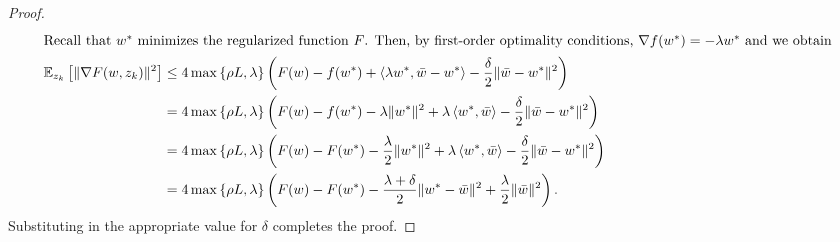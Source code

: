 \begin{proof}
\begin{align*}
       \intertext{Recall that \( w^*\) minimizes the regularized function \( F \). Then, by first-order optimality conditions, \( \nabla f(w^*) = - \lambda w^*\) and we obtain} 
       \mathbb{E}_{z_{k}}\left[\|\nabla F(w, z_{k})\|^2\right] &\leq 4 \max\left\{\rho L, \lambda\right\} \left(F(w) - f(w^*) + \left\langle\lambda w^*, \bar{w} - w^*\right\rangle - \frac{\delta}{2}\|\bar{w} - w^*\|^2 \right)\\
                                                     &= 4 \max\left\{\rho L, \lambda\right\} \left(F(w) - f(w^*) - \lambda \|w^*\|^2  + \lambda \left\langle w^*, \bar{w}\right\rangle - \frac{\delta}{2}\|\bar{w} - w^*\|^2\right)\\
                                                     &=  4 \max\left\{\rho L, \lambda\right\} \left(F(w) - F(w^*) - \frac{\lambda}{2} \|w^*\|^2 + \lambda \left\langle w^*, \bar{w}\right\rangle - \frac{\delta}{2}\|\bar{w} - w^*\|^2\right)\\
                                                     &= 4 \max\left\{\rho L, \lambda\right\} \left(F(w) - F(w^*) - \frac{\lambda + \delta}{2} \|w^* - \bar{w}\|^2 + \frac{\lambda}{2} \|\bar{w}\|^2\right).
   \end{align*} 
   Substituting in the appropriate value for \( \delta \) completes the proof.
\end{proof}

